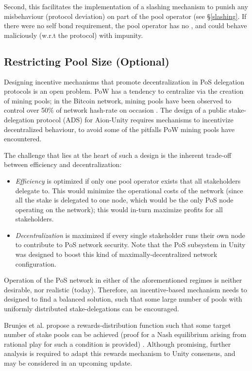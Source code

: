 Second, this facilitates the implementation of a slashing mechanism to punish any misbehaviour (protocol deviation) on part of the pool operator (see \S\ref{slashing}. If there were no self bond requirement, the pool operator has no , and could behave maliciously (w.r.t the protocol) with impunity. 

\subsection{Restricting Pool Size (Optional)}
Designing incentive mechanisms that promote decentralization in PoS delegation protocols is an open problem. PoW has a tendency to centralize via the creation of mining pools; in the Bitcoin network, mining pools have been observed to control over 50\% of network hash-rate on occasion \cite{RJZ+19}. The design of a public stake-delegation protocol (ADS) for Aion-Unity requires mechanisms to incentivize decentralized behaviour, to avoid some of the pitfalls PoW mining pools have encountered. 

The challenge that lies at the heart of such a design is the inherent trade-off between efficiency and decentralization: 
\begin{itemize}[label=--,nosep]
    \item \textit{Efficiency} is optimized if only one pool operator exists that all stakeholders delegate to. This would minimize the operational costs of the network (since all the stake is delegated to one node, which would be the only PoS node operating on the network); this would in-turn maximize profits for all stakeholders. 
    \item \textit{Decentralization} is maximized if every single stakeholder runs their own node to contribute to PoS network security. Note that the PoS subsystem in Unity was designed to boost this kind of maximally-decentralized network configuration. 
\end{itemize}

Operation of the PoS network in either of the aforementioned regimes is neither desirable, nor realistic (today). Therefore, an incentive-based mechanism needs to designed to find a balanced solution, such that some large number of pools with uniformly distributed stake-delegations can be encouraged. 

Brunjes et al. propose a rewards-distribution function such that some target number of stake pools can be achieved (proof for a Nash equilibrium arising from rational play for such a condition is provided) \cite{BKK+18}. Although promising, further analysis is required to adapt this rewards mechanism to Unity consensus, and may be considered in an upcoming update. 

